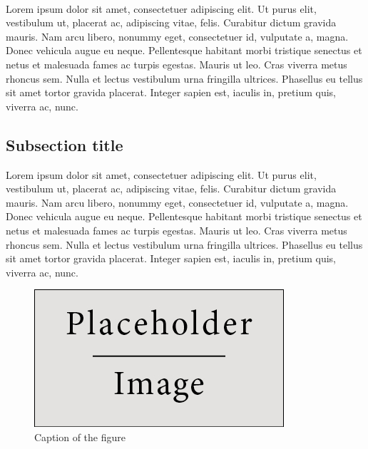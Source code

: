 \documentclass[a4paper]{article}
\theoremstyle{plain}
\begin{document}
\paragraph{}
Lorem ipsum dolor sit amet, consectetuer adipiscing elit. Ut purus elit, vestibulum ut, placerat ac, adipiscing vitae, felis. Curabitur dictum gravida mauris. Nam arcu libero, nonummy eget, consectetuer id, vulputate a, magna. Donec vehicula augue eu neque. Pellentesque habitant morbi tristique senectus et netus et malesuada fames ac turpis egestas. Mauris ut leo. Cras viverra metus rhoncus sem. Nulla et lectus vestibulum urna fringilla ultrices. Phasellus eu tellus sit amet tortor gravida placerat. Integer sapien est, iaculis in, pretium quis, viverra ac, nunc.

\subsection{Subsection title}

Lorem ipsum dolor sit amet, consectetuer adipiscing elit. Ut purus elit, vestibulum ut, placerat ac, adipiscing vitae, felis. Curabitur dictum gravida mauris. Nam arcu libero, nonummy eget, consectetuer id, vulputate a, magna. Donec vehicula augue eu neque. Pellentesque habitant morbi tristique senectus et netus et malesuada fames ac turpis egestas. Mauris ut leo. Cras viverra metus rhoncus sem. Nulla et lectus vestibulum urna fringilla ultrices. Phasellus eu tellus sit amet tortor gravida placerat. Integer sapien est, iaculis in, pretium quis, viverra ac, nunc.

\begin{figure}[H]
\centering
\includegraphics[scale=0.6]{test_image.jpg}
\caption{Caption of the figure}
\end{figure}
\end{document}
